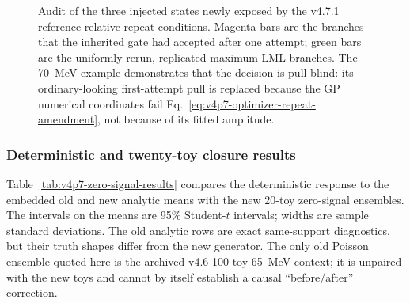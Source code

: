 \begin{figure}[htbp]
\centering
{}
\caption{Audit of the three injected states newly exposed by the v4.7.1
reference-relative repeat conditions.  Magenta bars are the branches that the
inherited gate had accepted after one attempt; green bars are the uniformly
rerun, replicated maximum-LML branches.  The 70~MeV example demonstrates that
the decision is pull-blind: its ordinary-looking first-attempt pull is replaced
because the GP numerical coordinates fail Eq.~\eqref{eq:v4p7-optimizer-repeat-amendment},
not because of its fitted amplitude.}
\label{fig:v4p7-near-threshold-optimizer-repair}
\end{figure}

\subsubsection{Deterministic and twenty-toy closure results}

Table~\ref{tab:v4p7-zero-signal-results} compares the deterministic response
to the embedded old and new analytic means with the new 20-toy zero-signal
ensembles.  The intervals on the means are 95\% Student-$t$ intervals; widths
are sample standard deviations.  The old analytic rows are exact same-support
diagnostics, but their truth shapes differ from the new generator.  The only
old Poisson ensemble quoted here is the archived v4.6 100-toy 65~MeV context;
it is unpaired with the new toys and cannot by itself establish a causal
``before/after'' correction.

